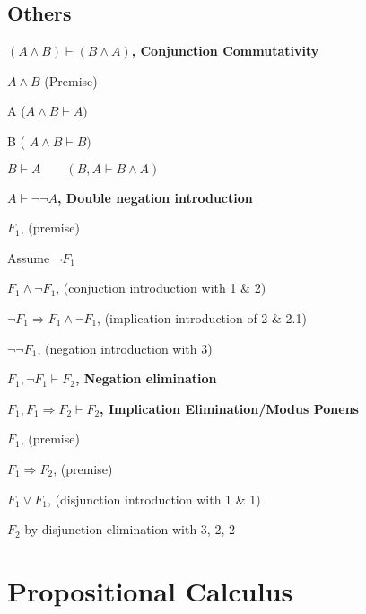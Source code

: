 \documentclass[12pt]{article}
\begin{document}
\begin{spacing}{1.5}
\subsection{Others}

\textbf{$(A \wedge B) \vdash (B \wedge A) $, Conjunction Commutativity}

\begin{enumerate*}
	\item $A \wedge B$ \qquad (Premise)
	\item A \qquad ($A \wedge B \vdash A)$
	\item B \qquad ( $A \wedge B \vdash B)$
	\item $B \vdash A \qquad (B, A \vdash B \wedge A)$ 
\end{enumerate*}

\textbf{$A \vdash \neg \neg A$, Double negation introduction}

\begin{enumerate*}
	\item $F_1$, (premise)
	\item Assume $\neg F_1$
		\begin{enumerate*}
			\item $F_1 \wedge \neg F_1$, (conjuction introduction with 1 \& 2)
		\end{enumerate*}
	\item $\neg F_1 \Rightarrow F_1 \wedge \neg F_1$, (implication introduction of 2 \& 2.1)
	\item $\neg \neg F_1$, (negation introduction with 3)
\end{enumerate*}

\textbf{$F_1, \neg F_1 \vdash F_2$, Negation elimination}

\textbf{$F_1, F_1 \Rightarrow F_2 \vdash F_2$, Implication Elimination/Modus Ponens}

\begin{enumerate*}
	\item $F_1$, (premise)
	\item $F_1 \Rightarrow F_2$, (premise)
	\item $F_1 \vee F_1$, (disjunction introduction with 1 \& 1)
	\item $F_2$ by disjunction elimination with 3, 2, 2
\end{enumerate*}

\section{Propositional Calculus}


\end{spacing}
\end{document}
